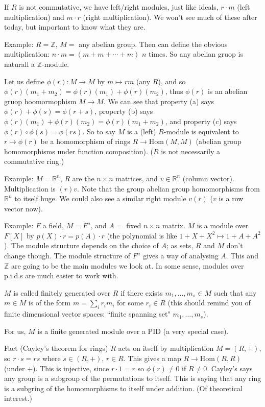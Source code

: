 \documentclass{article}
\theoremstyle{plain}
\theoremstyle{remark}
\newcommand{\Z}{{\mathbb Z}}
\newcommand{\R}{{\mathbb R}}
\begin{document}
If $R$ is not commutative, we have left/right modules, just like ideals,
$r \cdot m$ (left multiplication) and $m \cdot r$ (right multiplication).
We won't see much of these after today, but important to know what they are.

Example: $R = \Z$, $M =$ any abelian group.
Then can define the obvious multiplication: $n\cdot m = (m + m +\cdots + m)$ $n$ times.
So any abelian gruop is naturall a $\Z$-module.

Let us define $\phi(r) \colon M \to M$ by $m \mapsto rm$ (any $R$),
and so $\phi(r)(m_1 + m_2) = \phi(r)(m_1) + \phi(r)(m_2)$,
thus $\phi(r)$ is an abelian gruop hoomormophism $M \to M$.
We can see that property (a) says $\phi(r) + \phi(s) = \phi(r+s)$,
property (b) says $\phi(r)(m_1) + \phi(r)(m_2) = \phi(r)(m_1+m_2)$,
and property (c) says $\phi(r)\circ\phi(s) = \phi(rs)$.
So to say $M$ is a (left) $R$-module is equivalent to
$r \mapsto \phi(r)$ be a homomorphism of rings
$R \to \mathrm{Hom}(M,M)$ (abelian group homomorphisms under function composition).
($R$ is not necessarily a commutative ring.)

Example: $M = \R^n$, $R$ are the $n \times n$ matrices,
and $v \in \R^n$ (column vector).
Multiplication is $(r)v$.
Note that the group abelian group homomorphisms from $\R^n$ to itself huge.
We could also see a similar right module $v(r)$ ($v$ is a row vector now).

Example: $F$ a field, $M = F^n$, and $A = $ fixed $n \times n$ matrix.
$M$ is a module over $F[X]$ by $p(X) \cdot r = p(A) \cdot r$
(the polynomial is like $1 + X + X^2 \mapsto 1 + A + A^2$).
The module structure depends on the choice of $A$;
as sets, $R$ and $M$ don't change though.
The module structure of $F^n$ gives a way of analysing $A$.
This and $\Z$ are going to be the main modules we look at.
In some sense, modules over p.i.d.s are much easier to work with.

$M$ is called finitely generated over $R$ if there exists
$m_1,\dots,m_s \in M$ such that any $m \in M$ is of the form
$m = \sum_i r_i m_i$ for some $r_i \in R$
(this should remind you of finite dimensional vector spaces:
``finite spanning set" $m_1,\dots,m_s$).

For us, $M$ is a finite generated module over a PID (a very special case).

Fact (Cayley's theorem for rings) $R$ acts on itself by multiplication $M = (R,+)$,
so $r\cdot s = rs$ where $s \in (R,+)$, $r \in R$.
This gives a map $R \to \mathrm{Hom}(R,R)$ (under $+$).
This is injective, since $r \cdot 1 = r$ so $\phi(r) \neq 0$ if $R \neq 0$.
Cayley's says any group is a subgroup of the permutations to itself.
This is saying that any ring is a subgring of the homomorphisms
to itself under addition.
(Of theoretical interest.)
\end{document}
